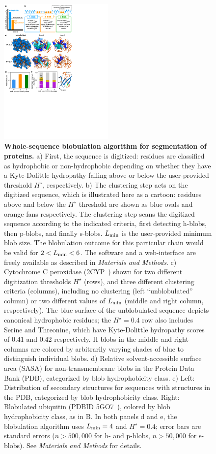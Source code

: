 \documentclass[9pt,twocolumn,twoside,lineno]{pnas-new}
\newcommand{\aucomment}[1]{}
\newcommand{\Ht}{H^{\star}}
\newcommand{\Lmin}{L_{\rm min}}
\begin{document}
\begin{figure}
\includegraphics[width=0.5\textwidth]{fig1.pdf}
\caption{{\bf Whole-sequence blobulation algorithm for segmentation of proteins.} \aucomment{Panels 1a and 1b replace the previous figure 1. Panels c-e are entirely new.} a) First, the sequence is digitized: residues are classified as hydrophobic or non-hydrophobic depending on whether they have a Kyte-Dolittle \cite{Kyte1982} hydropathy falling above or below the user-provided threshold $\Ht$, respectively. b) The clustering step acts on the digitized sequence, which is illustrated here as a cartoon: residues above and below the $\Ht$ threshold are shown as blue ovals and orange fans respectively. The clustering step scans the digitized sequence according to the indicated criteria, first detecting h-blobs, then p-blobs, and finally s-blobs. $\Lmin$ is the user-provided minimum blob size. The blobulation outcome for this particular chain would be valid for $2<\Lmin<6$. The software and a web-interface are freely available as described in {\em Materials and Methods}. c) Cytochrome C peroxidase (2CYP~\cite{Finzel1984}) shown for two different digitization thresholds $\Ht$ (rows), and three different clustering criteria (columns), including no clustering (left ``unblobulated'' column) or two different values of $\Lmin$ (middle and right column, respectively).  The blue surface of the unblobulated sequence depicts canonical hydrophobic residues; the $\Ht=0.4$ row also includes Serine and Threonine, which have Kyte-Dolittle hydropathy scores of 0.41 and 0.42 respectively. H-blobs in the middle and right columns are colored by arbitrarily varying shades of blue to distinguish individual blobs. d) Relative solvent-accessible surface area (SASA) for non-transmembrane blobs in the Protein Data Bank (PDB), categorized by blob hydrophobicity class. e) Left: Distribution of secondary structures for sequences with structures in the PDB, categorized by blob hydrophobicity class. Right: Blobulated ubiquitin (PDBID 5GO7~\cite{Gao2016}), colored by blob hydrophobicity class, as in B. In both panels d and e, the blobulation algorithm uses $\Lmin=4$ and $\Ht=0.4$; error bars are standard errors ($n>500,000$ for h- and p-blobs, $n>50,000$ for s- blobs). See {\em Materials and Methods} for details.}
\label{cartoon} 
\end{figure}
\end{document}
